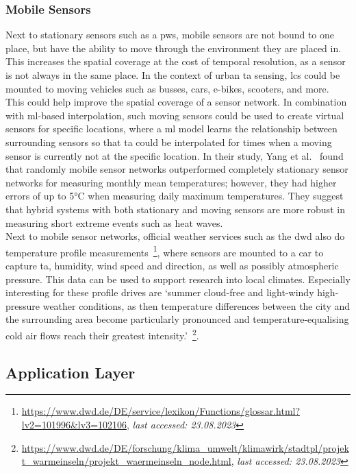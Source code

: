 \subsubsection{Mobile Sensors}

Next to stationary sensors such as a \gls{pws}, mobile sensors are not bound to one place, but have the ability to move through the environment they are placed in. This increases the spatial coverage at the cost of temporal resolution, as a sensor is not always in the same place. In the context of urban \gls{ta} sensing, \gls{lcs} could be mounted to moving vehicles such as busses, cars, e-bikes, scooters, and more. This could help improve the spatial coverage of a sensor network. In combination with \gls{ml}-based interpolation, such moving sensors could be used to create virtual sensors for specific locations, where a \gls{ml} model learns the relationship between surrounding sensors so that \gls{ta} could be interpolated for times when a moving sensor is currently not at the specific location. In their study, Yang et al.~\cite{yang2019designing} found that randomly mobile sensor networks outperformed completely stationary sensor networks for measuring monthly mean temperatures; however, they had higher errors of up to 5°C when measuring daily maximum temperatures. They suggest that hybrid systems with both stationary and moving sensors are more robust in measuring short extreme events such as heat waves.\\
Next to mobile sensor networks, official weather services such as the \gls{dwd} also do temperature profile measurements~\footnote{\url{https://www.dwd.de/DE/service/lexikon/Functions/glossar.html?lv2=101996&lv3=102106}, \textit{last accessed: 23.08.2023}}, where sensors are mounted to a car to capture \gls{ta}, humidity, wind speed and direction, as well as possibly atmospheric pressure. This data can be used to support research into local climates. Especially interesting for these profile drives are `summer cloud-free and light-windy high-pressure weather conditions, as then temperature differences between the city and the surrounding area become particularly pronounced and temperature-equalising cold air flows reach their greatest intensity.'~\footnote{\url{https://www.dwd.de/DE/forschung/klima\_umwelt/klimawirk/stadtpl/projekt\_warmeinseln/projekt\_waermeinseln\_node.html}, \textit{last accessed: 23.08.2023}}.

\subsection{Application Layer}

